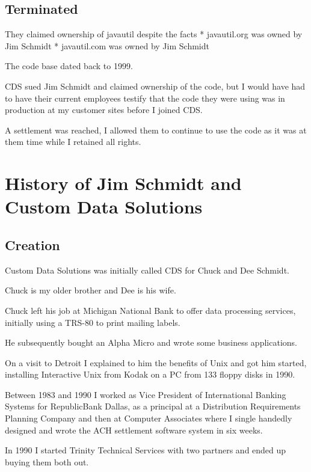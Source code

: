 \documentclass[letterpaper,10pt,english]{sphinxmanual}
\begin{document}
\subsection{Terminated}
\label{\detokenize{Contributions:terminated}}
They claimed ownership of javautil despite the facts
* javautil.org was owned by Jim Schmidt
* javautil.com was owned by Jim Schmidt

The code base dated back to 1999.

CDS sued Jim Schmidt and claimed ownership of the code, but I would have had to have their current employees testify that
the code they were using was in production at my customer sites before I joined CDS.

A settlement was reached, I allowed them to continue to use the code as it was at them time  while I retained all rights.


\section{History of Jim Schmidt and Custom Data Solutions}
\label{\detokenize{Contributions:id4}}

\subsection{Creation}
\label{\detokenize{Contributions:id5}}
Custom Data Solutions was initially called CDS for Chuck and Dee Schmidt.

Chuck is my older brother and Dee is his wife.

Chuck left his job at Michigan National Bank to offer data processing services, initially using a TRS-80 to print mailing labels.

He subsequently bought an Alpha Micro  and wrote some business applications.

On a visit to Detroit I explained to him the benefits of Unix and got him started, installing Interactive Unix from Kodak on a PC from 133 floppy disks in 1990.

Between 1983 and 1990 I worked as Vice President of International Banking Systems for RepublicBank Dallas, as a principal at a Distribution Requirements Planning Company and then at Computer Associates where I single handedly designed and wrote the ACH settlement software system in six weeks.

In 1990 I started Trinity Technical Services with two partners and ended up buying them both out.
\end{document}
